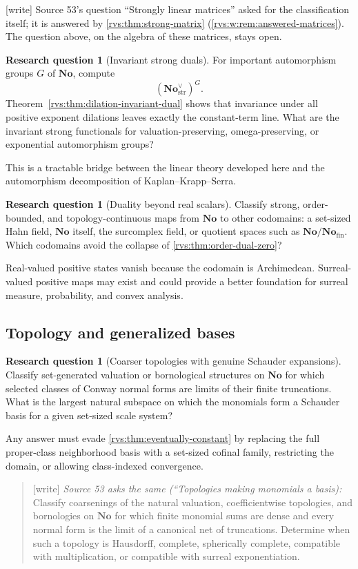 \documentclass[11pt,letterpaper]{article}
\numberwithin{equation}{section}
\theoremstyle{definition}
\newtheorem{question}[theorem]{Research question}
\theoremstyle{remark}
\newcommand{\No}{\mathbf{No}}
\newcommand{\Fin}{\No_{\mathrm{fin}}}
\newcommand{\wtag}{\textup{[write]}}%
\begin{document}
\noindent\wtag{} Source 53's question ``Strongly linear matrices'' asked for
the classification itself; it is answered by \cref{rvs:thm:strong-matrix}
(\cref{rvs:w:rem:answered-matrices}).  The question above, on the algebra of
these matrices, stays open.


\begin{question}[Invariant strong duals]
For important automorphism groups \(G\) of \(\No\), compute
\[
  (\No^{\vee}_{\mathrm{str}})^G.
\]
Theorem~\ref{rvs:thm:dilation-invariant-dual} shows that invariance under all
positive exponent dilations leaves exactly the constant-term line.  What are
the invariant strong functionals for valuation-preserving, omega-preserving,
or exponential automorphism groups?
\end{question}

This is a tractable bridge between the linear theory developed here and the
automorphism decomposition of Kaplan--Krapp--Serra.

\begin{question}[Duality beyond real scalars]
Classify strong, order-bounded, and topology-continuous maps from \(\No\) to
other codomains: a set-sized Hahn field, \(\No\) itself, the surcomplex field,
or quotient spaces such as \(\No/\Fin\).  Which codomains avoid the collapse
of \cref{rvs:thm:order-dual-zero}?
\end{question}

Real-valued positive states vanish because the codomain is Archimedean.
Surreal-valued positive maps may exist and could provide a better foundation
for surreal measure, probability, and convex analysis.

\subsection{Topology and generalized bases}

\begin{question}[Coarser topologies with genuine Schauder expansions]
Classify set-generated valuation or bornological structures on \(\No\) for
which selected classes of Conway normal forms are limits of their finite
truncations.  What is the largest natural subspace on which the monomials form
a Schauder basis for a given set-sized scale system?
\end{question}

Any answer must evade \cref{rvs:thm:eventually-constant} by replacing the full
proper-class neighborhood basis with a set-sized cofinal family, restricting
the domain, or allowing class-indexed convergence.
\begin{quote}\small
\wtag{} \emph{Source 53 asks the same (``Topologies making monomials a basis):}
Classify coarsenings of the natural valuation, coefficientwise topologies, and
bornologies on $\No$ for which finite monomial sums are dense and every normal
form is the limit of a canonical net of truncations. Determine when such a topology
is Hausdorff, complete, spherically complete, compatible with multiplication, or
compatible with surreal exponentiation.
\end{quote}
\end{document}
